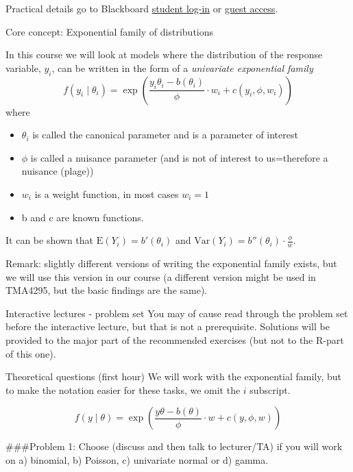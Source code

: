 \documentclass[
  ignorenonframetext,
]{beamer}
\begin{document}
\begin{frame}{Practical details}
\protect\hypertarget{practical-details}{}
go to Blackboard \href{https://innsida.ntnu.no/bb-student}{student
log-in} or
\href{https://ntnu.blackboard.com/webapps/login?action=guest_login\&new_loc=/webapps/blackboard/execute/courseMain?course_id=_11002_1}{guest
access}.
\end{frame}

\begin{frame}{Core concept: Exponential family of distributions}
\protect\hypertarget{core-concept-exponential-family-of-distributions}{}
\end{frame}

\begin{frame}
In this course we will look at models where the distribution of the
response variable, \(y_i\), can be written in the form of a
\emph{univariate exponential family}
\[ f(y_i\mid \theta_i)=\exp \left( \frac{y_i \theta_i-b(\theta_i)}{\phi}\cdot w_i + c(y_i, \phi, w_i) \right) \]
where

\begin{itemize}
\item
  \(\theta_i\) is called the canonical parameter and is a parameter of
  interest
\item
  \(\phi\) is called a nuisance parameter (and is not of interest to
  us=therefore a nuisance (plage))
\item
  \(w_i\) is a weight function, in most cases \(w_i=1\)
\item
  b and c are known functions.
\end{itemize}

It can be shown that \(\text{E}(Y_i)=b'(\theta_i)\) and
\(\text{Var}(Y_i)=b''(\theta_i)\cdot \frac{\phi}{w}\).

Remark: slightly different versions of writing the exponential family
exists, but we will use this version in our course (a different version
might be used in TMA4295, but the basic findings are the same).
\end{frame}

\begin{frame}{Interactive lectures - problem set}
\protect\hypertarget{interactive-lectures---problem-set}{}
You may of cause read through the problem set before the interactive
lecture, but that is not a prerequisite. Solutions will be provided to
the major part of the recommended exercises (but not to the R-part of
this one).

\begin{block}{Theoretical questions (first hour)}
\protect\hypertarget{theoretical-questions-first-hour}{}
We will work with the exponential family, but to make the notation
easier for these tasks, we omit the \(i\) subscript.

\[ f(y \mid \theta)=\exp \left( \frac{y \theta-b(\theta)}{\phi}\cdot w + c(y, \phi, w) \right) \]

\#\#\#Problem 1: Choose (discuss and then talk to lecturer/TA) if you
will work on a) binomial, b) Poisson, c) univariate normal or d) gamma.
\end{block}
\end{frame}
\end{document}
